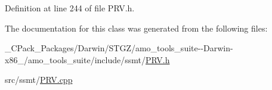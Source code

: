 Definition at line 244 of file P\+R\+V.\+h.



The documentation for this class was generated from the following files\+:\begin{DoxyCompactItemize}
\item 
\+\_\+\+C\+Pack\+\_\+\+Packages/\+Darwin/\+S\+T\+G\+Z/amo\+\_\+tools\+\_\+suite-\/-\/\+Darwin-\/x86\+\_/amo\+\_\+tools\+\_\+suite/include/ssmt/\hyperlink{___c_pack___packages_2_darwin_2_s_t_g_z_2amo__tools__suite--_darwin-x86__64_2amo__tools__suite_2include_2ssmt_2_p_r_v_8h}{P\+R\+V.\+h}\item 
src/ssmt/\hyperlink{_p_r_v_8cpp}{P\+R\+V.\+cpp}\end{DoxyCompactItemize}
